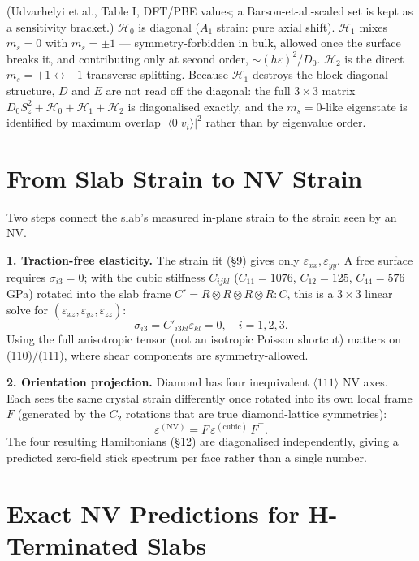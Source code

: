 \documentclass[11pt]{article}
\begin{document}
(Udvarhelyi et al., Table I, DFT/PBE values; a Barson-et-al.-scaled set is kept as a sensitivity bracket.) $\mathcal{H}_0$ is diagonal ($A_1$ strain: pure axial shift). $\mathcal{H}_1$ mixes $m_s{=}0$ with $m_s{=}\pm1$ --- symmetry-forbidden in bulk, allowed once the surface breaks it, and contributing only at second order, $\sim(h\varepsilon)^2/D_0$. $\mathcal{H}_2$ is the direct $m_s{=}{+}1 \leftrightarrow {-}1$ transverse splitting. Because $\mathcal{H}_1$ destroys the block-diagonal structure, $D$ and $E$ are not read off the diagonal: the full $3\times3$ matrix $D_0 S_z^2 + \mathcal{H}_0 + \mathcal{H}_1 + \mathcal{H}_2$ is diagonalised exactly, and the $m_s{=}0$-like eigenstate is identified by maximum overlap $|\langle0|v_i\rangle|^2$ rather than by eigenvalue order.

\section{From Slab Strain to NV Strain}

Two steps connect the slab's measured in-plane strain to the strain seen by an NV.

\textbf{1. Traction-free elasticity.} The strain fit (\S9) gives only $\varepsilon_{xx}, \varepsilon_{yy}$. A free surface requires $\sigma_{i3} = 0$; with the cubic stiffness $C_{ijkl}$ ($C_{11}{=}1076$, $C_{12}{=}125$, $C_{44}{=}576$\,GPa) rotated into the slab frame $C' = R{\otimes}R{\otimes}R{\otimes}R : C$, this is a $3\times3$ linear solve for $(\varepsilon_{xz}, \varepsilon_{yz}, \varepsilon_{zz})$:
\begin{equation}
\sigma_{i3} = C'_{i3kl}\varepsilon_{kl} = 0, \quad i = 1,2,3.
\end{equation}
Using the full anisotropic tensor (not an isotropic Poisson shortcut) matters on (110)/(111), where shear components are symmetry-allowed.

\textbf{2. Orientation projection.} Diamond has four inequivalent $\langle111\rangle$ NV axes. Each sees the same crystal strain differently once rotated into its own local frame $F$ (generated by the $C_2$ rotations that are true diamond-lattice symmetries):
\begin{equation}
\varepsilon^{(\text{NV})} = F\,\varepsilon^{(\text{cubic})}\,F^{\top}.
\end{equation}
The four resulting Hamiltonians (\S12) are diagonalised independently, giving a predicted zero-field stick spectrum per face rather than a single number.

\section{Exact NV Predictions for H-Terminated Slabs}
\end{document}
